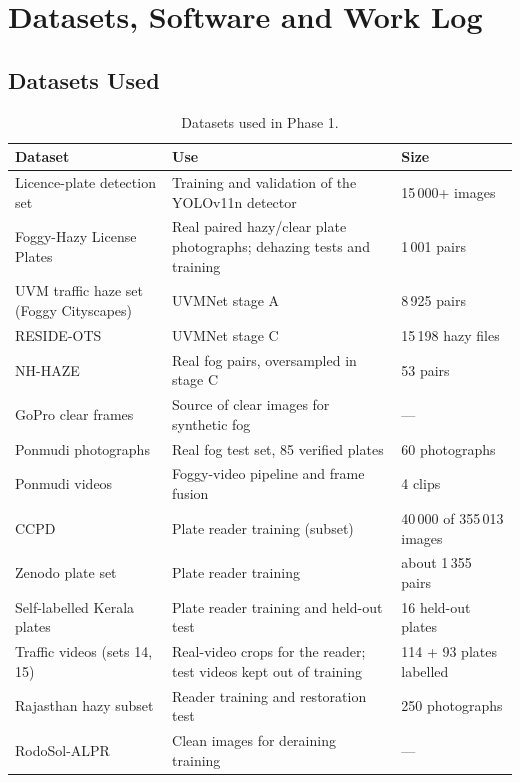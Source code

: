\chapter{Datasets, Software and Work Log}
\label{app:env}

\section{Datasets Used}

\begin{table}[h]
\centering
\caption{Datasets used in Phase 1.}
\small
\begin{tabularx}{\textwidth}{@{}p{3.6cm}Xp{3.6cm}@{}}
\toprule
\textbf{Dataset} & \textbf{Use} & \textbf{Size}\\
\midrule
Licence-plate detection set & Training and validation of the YOLOv11n detector & 15\,000+ images\\
Foggy-Hazy License Plates & Real paired hazy/clear plate photographs; dehazing tests and training & 1\,001 pairs\\
UVM traffic haze set (Foggy Cityscapes) & UVMNet stage A & 8\,925 pairs\\
RESIDE-OTS & UVMNet stage C & 15\,198 hazy files\\
NH-HAZE & Real fog pairs, oversampled in stage C & 53 pairs\\
GoPro clear frames & Source of clear images for synthetic fog & ---\\
Ponmudi photographs & Real fog test set, 85 verified plates & 60 photographs\\
Ponmudi videos & Foggy-video pipeline and frame fusion & 4 clips\\
CCPD & Plate reader training (subset) & 40\,000 of 355\,013 images\\
Zenodo plate set & Plate reader training & about 1\,355 pairs\\
Self-labelled Kerala plates & Plate reader training and held-out test & 16 held-out plates\\
Traffic videos (sets 14, 15) & Real-video crops for the reader; test videos kept out of training & 114 + 93 plates labelled\\
Rajasthan hazy subset & Reader training and restoration test & 250 photographs\\
RodoSol-ALPR & Clean images for deraining training & ---\\
\bottomrule
\end{tabularx}
\end{table}

